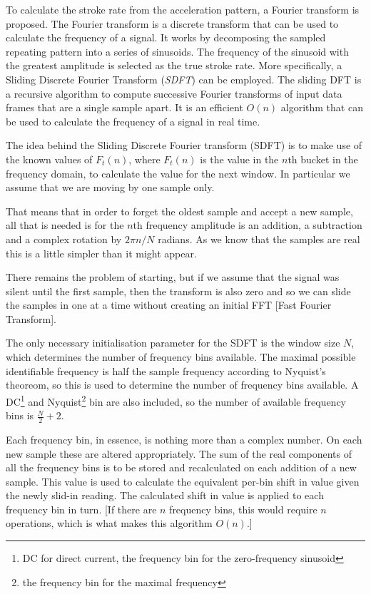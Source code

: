 \documentclass[11pt,twoside,a4paper]{report}
\begin{document}
To calculate the stroke rate from the acceleration pattern, a Fourier transform is proposed. The Fourier transform is a discrete transform that can be used to calculate the frequency of a signal. It works by decomposing the sampled repeating pattern into a series of sinusoids. The frequency of the sinusoid with the greatest amplitude is selected as the true stroke rate. More specifically, a Sliding Discrete Fourier Transform (\textit{SDFT}) can be employed. The sliding DFT is a recursive algorithm to compute successive Fourier transforms of input data frames that are a single sample apart. It is an efficient $O(n)$ algorithm that can be used to calculate the frequency of a signal in real time.

\begin{displayquote}
  The idea behind the Sliding Discrete Fourier transform (SDFT) is to make use of the known values of $F_t(n)$, where $F_t(n)$ is the value in the $n$th bucket in the frequency domain, to calculate the value for the next window. In particular we assume that we are moving by one sample only.
  
  That means that in order to forget the oldest sample and accept a new sample, all that is needed is for the $n$th frequency amplitude is an addition, a subtraction and a complex rotation by $2\pi n / N$ radians. As we know that the samples are real this is a little simpler than it might appear.

  There remains the problem of starting, but if we assume that the signal was silent until the first sample, then the transform is also zero and so we can slide the samples in one at a time without creating an initial FFT [Fast Fourier Transform].


\end{displayquote}

The only necessary initialisation parameter for the SDFT is the window size $N$, which determines the number of frequency bins available. The maximal possible identifiable frequency is half the sample frequency according to Nyquist's theoreom, so this is used to determine the number of frequency bins available. A DC\footnote{DC for direct current, the frequency bin for the zero-frequency sinusoid} and Nyquist\footnote{the frequency bin for the maximal frequency} bin are also included, so the number of available frequency bins is $\frac{N}{2} + 2$.

\label{par:slideFreqBin}
Each frequency bin, in essence, is nothing more than a complex number. On each new sample these are altered appropriately. The sum of the real components of all the frequency bins is to be stored and recalculated on each addition of a new sample. This value is used to calculate the equivalent per-bin shift in value given the newly slid-in reading. The calculated shift in value is applied to each frequency bin in turn. [If there are $n$ frequency bins, this would require $n$ operations, which is what makes this algorithm $O(n)$.] 
\end{document}
